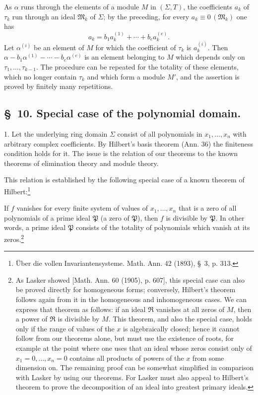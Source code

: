 \documentclass[11pt]{article}
\newcommand{\ideal}[1]{\mathfrak{#1}}
\newcommand{\eqzero}[1]{\equiv 0\,(#1)}
\begin{document}
As $\alpha$ runs through the elements of a module $M$ in $(\Sigma,T)$, the coefficients $a_k$ of $\tau_k$ run through an ideal $\ideal M_k$ of $\Sigma$; by the preceding, for every $a_k\eqzero{\ideal M_k}$ one has
\[
 a_k=b_1a_k^{(1)}+\cdots+b_ea_k^{(e)}.
\]
Let $\alpha^{(i)}$ be an element of $M$ for which the coefficient of $\tau_k$ is $a_k^{(i)}$. Then $\alpha-b_1\alpha^{(1)}-\cdots-b_e\alpha^{(e)}$ is an element belonging to $M$ which depends only on $\tau_1,
\ldots,\tau_{k-1}$. The procedure can be repeated for the totality of these elements, which no longer contain $\tau_k$ and which form a module $M'$, and the assertion is proved by finitely many repetitions.

\subsection*{\S~10. Special case of the polynomial domain.}

1. Let the underlying ring domain $\Sigma$ consist of all polynomials in $x_1,
\ldots,x_n$ with arbitrary complex coefficients. By Hilbert's basis theorem (Ann. 36) the finiteness condition holds for it. The issue is the relation of our theorems to the known theorems of elimination theory and module theory.

This relation is established by the following special case of a known theorem of Hilbert:\footnote{Über die vollen Invariantensysteme. Math. Ann. 42 (1893), \S~3, p. 313.}

If $f$ vanishes for every finite system of values of $x_1,
\ldots,x_n$ that is a zero of all polynomials of a prime ideal $\ideal P$ (a zero of $\ideal P$), then $f$ is divisible by $\ideal P$. In other words, a prime ideal $\ideal P$ consists of the totality of polynomials which vanish at its zeros.\footnote{As Lasker showed [Math. Ann. 60 (1905), p. 607], this special case can also be proved directly for homogeneous forms; conversely, Hilbert's theorem follows again from it in the homogeneous and inhomogeneous cases. We can express that theorem as follows: if an ideal $\ideal R$ vanishes at all zeros of $M$, then a power of $\ideal R$ is divisible by $M$. This theorem, and also the special case, holds only if the range of values of the $x$ is algebraically closed; hence it cannot follow from our theorems alone, but must use the existence of roots, for example at the point where one uses that an ideal whose zeros consist only of $x_1=0,
\ldots,x_n=0$ contains all products of powers of the $x$ from some dimension on. The remaining proof can be somewhat simplified in comparison with Lasker by using our theorems. For Lasker must also appeal to Hilbert's theorem to prove the decomposition of an ideal into greatest primary ideals.}
\end{document}
